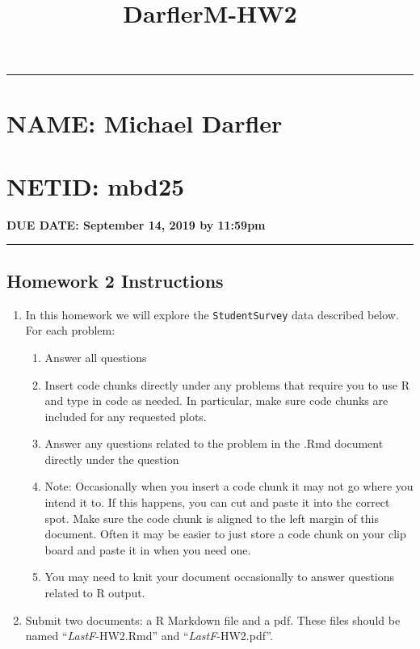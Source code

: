 \documentclass[]{article}
\title{DarflerM-HW2}
\author{}
\date{}
\begin{document}
\maketitle

\begin{center}\rule{0.5\linewidth}{\linethickness}\end{center}

\hypertarget{name-michael-darfler}{%
\section{NAME: Michael Darfler}\label{name-michael-darfler}}

\hypertarget{netid-mbd25}{%
\section{NETID: mbd25}\label{netid-mbd25}}

\textbf{DUE DATE: September 14, 2019 by 11:59pm }

\begin{center}\rule{0.5\linewidth}{\linethickness}\end{center}

\hypertarget{homework-2-instructions}{%
\subsection{\texorpdfstring{\textbf{Homework 2 Instructions
}}{Homework 2 Instructions }}\label{homework-2-instructions}}

\begin{enumerate}
\def\labelenumi{\arabic{enumi}.}
\item
  In this homework we will explore the \texttt{StudentSurvey} data
  described below. For each problem:

  \begin{enumerate}
  \def\labelenumii{\alph{enumii})}
  \item
    Answer all questions
  \item
    Insert code chunks directly under any problems that require you to
    use R and type in code as needed. In particular, make sure code
    chunks are included for any requested plots.
  \item
    Answer any questions related to the problem in the .Rmd document
    directly under the question
  \item
    Note: Occasionally when you insert a code chunk it may not go where
    you intend it to. If this happens, you can cut and paste it into the
    correct spot. Make sure the code chunk is aligned to the left margin
    of this document. Often it may be easier to just store a code chunk
    on your clip board and paste it in when you need one.
  \item
    You may need to knit your document occasionally to answer questions
    related to R output.
  \end{enumerate}
\item
  Submit two documents: a R Markdown file and a pdf. These files should
  be named ``\emph{LastF}-HW2.Rmd'' and ``\emph{LastF}-HW2.pdf''.
\end{enumerate}
\end{document}
